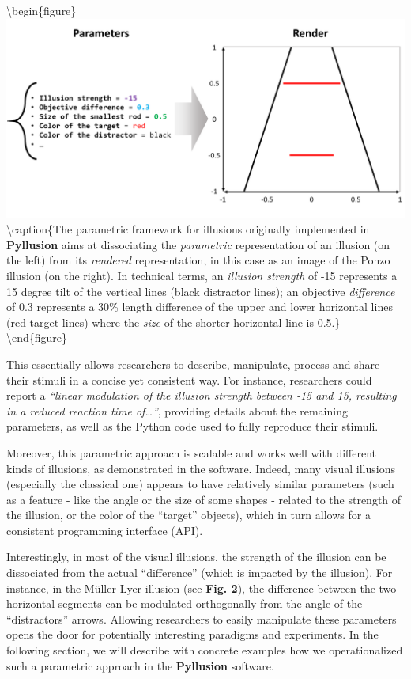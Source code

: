 \documentclass[
  english,
  man,floatsintext]{apa6}
\begin{document}
\textbackslash begin\{figure\}
\includegraphics[width=1\linewidth]{figure2} \textbackslash caption\{The parametric framework for illusions originally implemented in \textbf{Pyllusion} aims at dissociating the \emph{parametric} representation of an illusion (on the left) from its \emph{rendered} representation, in this case as an image of the Ponzo illusion (on the right). In technical terms, an \emph{illusion strength} of -15 represents a 15 degree tilt of the vertical lines (black distractor lines); an objective \emph{difference} of 0.3 represents a 30\% length difference of the upper and lower horizontal lines (red target lines) where the \emph{size} of the shorter horizontal line is 0.5.\}\label{fig:unnamed-chunk-2}
\textbackslash end\{figure\}

This essentially allows researchers to describe, manipulate, process and share their stimuli in a concise yet consistent way. For instance, researchers could report a \emph{``linear modulation of the illusion strength between -15 and 15, resulting in a reduced reaction time of\ldots{}''}, providing details about the remaining parameters, as well as the Python code used to fully reproduce their stimuli.

Moreover, this parametric approach is scalable and works well with different kinds of illusions, as demonstrated in the software. Indeed, many visual illusions (especially the classical one) appears to have relatively similar parameters (such as a feature - like the angle or the size of some shapes - related to the strength of the illusion, or the color of the ``target'' objects), which in turn allows for a consistent programming interface (API).

Interestingly, in most of the visual illusions, the strength of the illusion can be dissociated from the actual ``difference'' (which is impacted by the illusion). For instance, in the Müller-Lyer illusion (see \textbf{Fig. 2}), the difference between the two horizontal segments can be modulated orthogonally from the angle of the ``distractors'' arrows. Allowing researchers to easily manipulate these parameters opens the door for potentially interesting paradigms and experiments. In the following section, we will describe with concrete examples how we operationalized such a parametric approach in the \textbf{Pyllusion} software.
\end{document}
